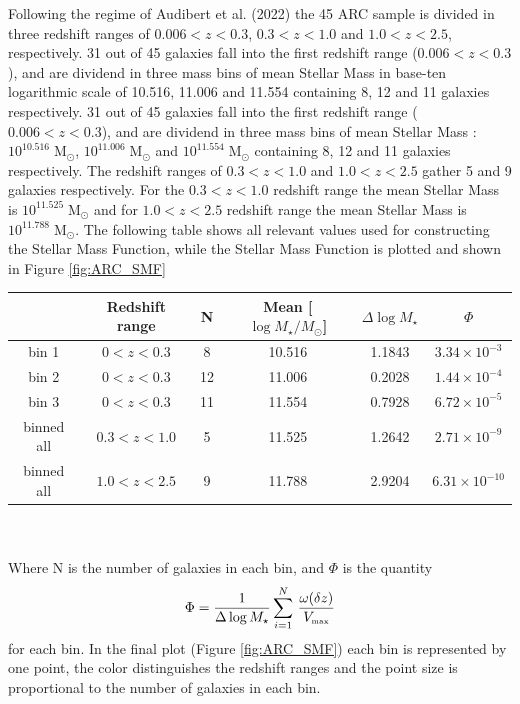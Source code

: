 Following the regime of Audibert et al. (2022)\cite{Audibert2022} the 45 ARC sample is divided in three redshift ranges of $0.006<z<0.3$, $0.3<z<1.0$ and $1.0<z<2.5$, respectively. 31 out of 45 galaxies fall into the first redshift range ($0.006<z<0.3$), and are dividend in three mass bins of mean Stellar Mass in base-ten logarithmic scale of 10.516, 11.006 and 11.554 containing 8, 12 and 11 galaxies respectively. 31 out of 45 galaxies fall into the first redshift range ( $0.006<z<0.3$), and are dividend in three mass bins of mean Stellar Mass : $10^{10.516}\;\mbox{M}_\odot$, $10^{11.006}\;\mbox{M}_\odot$ and $10^{11.554}\; \mbox{M}_\odot$ containing 8, 12 and 11 galaxies respectively.
The redshift ranges of $0.3<z<1.0$ and $1.0<z<2.5$ gather 5 and 9 galaxies respectively. For the $0.3<z<1.0$ redshift range the mean Stellar Mass is $10^{11.525}\;\mbox{M}_\odot$ and for $1.0<z<2.5$ redshift range the mean Stellar Mass is $10^{11.788}\;\mbox{M}_\odot$. The following table shows all relevant values used for constructing the Stellar Mass Function, while the Stellar Mass Function is plotted and shown in Figure \ref{fig:ARC_SMF}\\
\begin{tabular}{cccccc}
    \addlinespace
    \hline  %
    {} & Redshift range & N &  Mean [$\log M_\star/M_\odot$] &   $\Delta \log M_\star$ & $\Phi$  \\
    \hline   %
    \hline   %
    bin 1 & $0<z<0.3$ & 8 & 10.516  & 1.1843  & $3.34\times10^{-3}$ \\      
    bin 2  & $0<z<0.3$ & 12 & 11.006  & 0.2028  &  $1.44 \times10^{-4}$ \\
    bin 3 & $0<z<0.3$ & 11 & 11.554  & 0.7928   & $6.72 \times10^{-5}$\\
    \hline
    binned all  & $0.3<z<1.0$ & 5 & 11.525 & 1.2642   & $2.71 \times10^{-9}$\\
    \hline
    binned all & $1.0<z<2.5$ & 9  & 11.788  & 2.9204   & $6.31 \times10^{-10}$\\
    \hline
    \end{tabular} \\ \\
Where N is the number of galaxies in each bin, and $\Phi$ is the quantity $$\Phi = \dfrac{1}{\Delta \log M_{\star }} \sum_{i=1}^N \, \dfrac{\omega(\delta z) }{V_{\mbox{\tiny{max}}}}$$ for each bin. In the final plot (Figure \ref{fig:ARC_SMF}) each bin is represented by one point, the color distinguishes the redshift ranges and the point size is proportional to the number of galaxies in each bin.


